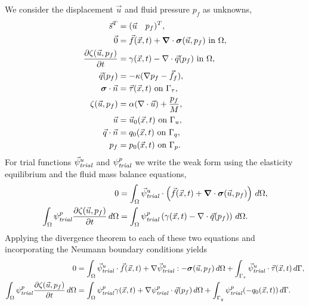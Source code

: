 We consider the displacement $\vec{u}$ and fluid pressure $p_f$ as unknowns,
\begin{align}
  \vec{s}^T &= (\vec{u} \quad p_f)^T, \\
%
  \vec{0} &= \vec{f}(\vec{x},t) + \tensor{\nabla} \cdot \tensor{\sigma}(\vec{u},p_f) 
\text{ in }\Omega, \\
%
  \frac{\partial \zeta(\vec{u},p_f)}{\partial t} &= \gamma(\vec{x},t) - \nabla \cdot \vec{q}
(p_f) \text{ in }
\Omega, \\
%
  \vec{q}(p_f) &= -\kappa (\nabla p_f - \vec{f}_f), \\
%
  \tensor{\sigma} \cdot \vec{n} &= \vec{\tau}(\vec{x},t) \text{ on }\Gamma_\tau, \\
%
  \zeta(\vec{u},p_f) &= \alpha (\nabla \cdot \vec{u}) + \frac{p_f}{M}, \\
%
  \vec{u} &= \vec{u}_0(\vec{x},t) \text{ on }\Gamma_u, \\
%
  \vec{q} \cdot \vec{n} &= q_0(\vec{x},t) \text{ on }\Gamma_q, \\
%
  p_f &= p_0(\vec{x},t) \text{ on }\Gamma_p.
\end{align}
For trial functions $\trialvec[u]$ and $\trialscalar[p]$ we write the weak form
using the elasticity equilibrium and the fluid mass balance equations,
\begin{align}
  0 &= \int_\Omega \trialvec[u] \cdot \left( \vec{f}(\vec{x},t) + \tensor{\nabla} \cdot 
\tensor{\sigma}
(\vec{u},p_f) \right) \, d\Omega, \\
%
 \int_\Omega  \trialscalar[p] \frac{\partial \zeta(\vec{u},p_f)}{\partial t} \, d\Omega &= 
\int_\Omega 
\trialscalar[p] \left(\gamma(\vec{x},t) - \nabla \cdot \vec{q}(p_f)\right) \, d\Omega.
\end{align}
Applying the divergence theorem to each of these two equations and incorporating the Neumann 
boundary conditions 
yields
\begin{align}
  0 &= \int_\Omega \trialvec[u] \cdot \vec{f}(\vec{x},t) + \nabla \trialvec[u] : -
\tensor{\sigma}(\vec{u},p_f) \, 
d\Omega + \int_{\Gamma_\tau} \trialvec[u] \cdot \vec{\tau}(\vec{x},t) \, d\Gamma, \\
%
 \int_\Omega  \trialscalar[p] \frac{\partial \zeta(\vec{u},p_f)}{\partial t} \, d\Omega &= 
 \int_\Omega \trialscalar[p] \gamma(\vec{x},t) + \nabla \trialscalar[p] \cdot \vec{q}(p_f) \, 
d\Omega
 + \int_{\Gamma_q} \trialscalar[p] (-q_0(\vec{x},t)) \, d\Gamma.
\end{align}
